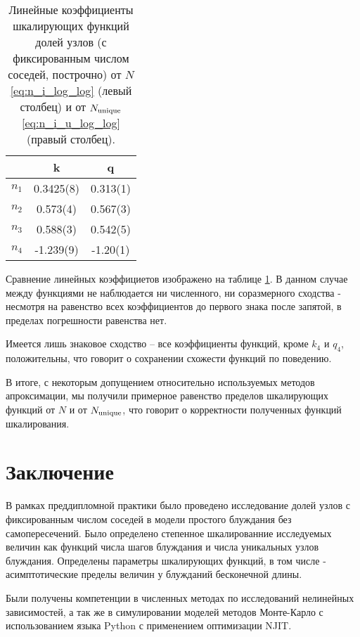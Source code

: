 \begin{table}[h]
\centering
\begin{tabular}{|c|c|c|}
\hline
 & k & q \\ \hline
$n_1$ & 0.3425(8) &  0.313(1) \\ \hline
$n_2$ & 0.573(4) & 0.567(3) \\ \hline
$n_3$ & 0.588(3) & 0.542(5) \\ \hline
$n_4$ & -1.239(9) & -1.20(1) \\ \hline
\end{tabular}
\caption{Линейные коэффициенты шкалирующих функций долей узлов (с фиксированным числом соседей, построчно) от $N$ \eqref{eq:n_i_log_log} (левый столбец) и от $N_{\textup{unique}}$ \eqref{eq:n_i_u_log_log} (правый столбец).}
\label{tab:kq_compare}
\end{table}

Сравнение линейных коэффициетов изображено на таблице \ref{tab:kq_compare}. 
В данном случае между функциями не наблюдается ни численного, ни соразмерного сходства - несмотря на равенство всех коэффициентов до первого знака после запятой, в пределах погрешности равенства нет.

Имеется лишь знаковое сходство -- все коэффициенты функций, кроме $k_4$ и $q_4$, положительны, что говорит о сохранении схожести функций по поведению.

В итоге, с некоторым допущением относительно используемых методов апроксимации, мы получили примерное равенство пределов шкалирующих функций от $N$ и от $N_{\textup{unique}}$, что говорит о корректности полученных функций шкалирования.


\section{Заключение}

В рамках преддипломной практики было проведено исследование долей узлов с фиксированным числом соседей в модели простого блуждания без самопересечений.
Было определено степенное шкалированние исследуемых величин как функций числа шагов блуждания и числа уникальных узлов блуждания.
Определены параметры шкалирующих функций, в том числе - асимптотические пределы величин у блужданий бесконечной длины.

Были получены компетенции в численных методах по исследований нелинейных зависимостей, 
а так же в симулировании моделей методов Монте-Карло с использованием языка Python с применением оптимизации NJIT.